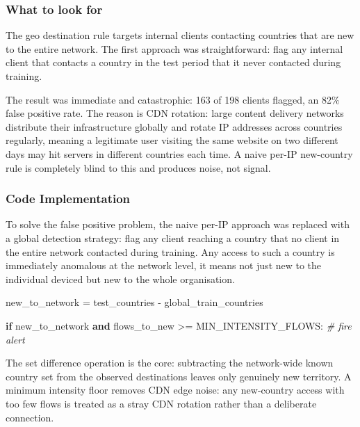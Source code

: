 \documentclass[
  11pt,
]{article}
\newenvironment{Shaded}{\vspace{4pt}}{\vspace{4pt}}
\newcommand{\CommentTok}[1]{\textcolor[rgb]{0.38,0.63,0.69}{\textit{#1}}}
\newcommand{\ControlFlowTok}[1]{\textcolor[rgb]{0.00,0.44,0.13}{\textbf{#1}}}
\newcommand{\KeywordTok}[1]{\textcolor[rgb]{0.00,0.44,0.13}{\textbf{#1}}}
\newcommand{\NormalTok}[1]{#1}
\newcommand{\OperatorTok}[1]{\textcolor[rgb]{0.40,0.40,0.40}{#1}}
\begin{document}
\hypertarget{what-to-look-for-3}{%
\subsubsection{What to look for}\label{what-to-look-for-3}}

The geo destination rule targets internal clients contacting countries
that are new to the entire network. The first approach was
straightforward: flag any internal client that contacts a country in the
test period that it never contacted during training.

The result was immediate and catastrophic: 163 of 198 clients flagged,
an 82\% false positive rate. The reason is CDN rotation: large content
delivery networks distribute their infrastructure globally and rotate IP
addresses across countries regularly, meaning a legitimate user visiting
the same website on two different days may hit servers in different
countries each time. A naive per-IP new-country rule is completely blind
to this and produces noise, not signal.

\subsubsection{Code Implementation}



To
solve the false positive problem, the naive per-IP approach was replaced
with a global detection strategy: flag any client reaching a country
that no client in the entire network contacted during training. Any
access to such a country is immediately anomalous at the network level,
it means not just new to the individual deviced but new to the whole
organisation.

\begin{Shaded}
\begin{Highlighting}[]
\NormalTok{new\_to\_network }\OperatorTok{=}\NormalTok{ test\_countries }\OperatorTok{{-}}\NormalTok{ global\_train\_countries}

\ControlFlowTok{if}\NormalTok{ new\_to\_network }\KeywordTok{and}\NormalTok{ flows\_to\_new }\OperatorTok{\textgreater{}=}\NormalTok{ MIN\_INTENSITY\_FLOWS:}
      \CommentTok{\# fire alert}
\end{Highlighting}
\end{Shaded}

The set difference operation is the core: subtracting the network-wide
known country set from the observed destinations leaves only genuinely
new territory. A minimum intensity floor removes CDN edge noise: any
new-country access with too few flows is treated as a stray CDN
rotation rather than a deliberate connection.
\end{document}
